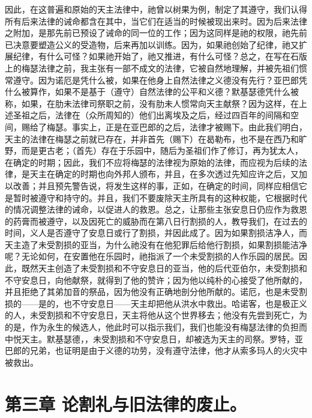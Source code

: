 因此，在这普遍和原始的天主法律中，祂曾以树果为例，制定了其遵守，我们认得所有后来法律的诫命都含在其中，当它们在适当的时候被现出来时。因为后来法律之附加，是那先前已预设了诫命的同一位的工作；因为这同样是祂的权限，祂先前已决意要塑造公义的受造物，后来再加以训练。因为，如果祂创始了纪律，祂又扩展纪律，有什么可怪？如果祂开始了，祂又推进，有什么可怪？总之，在写在石版上的梅瑟法律之前，我主张有一部不成文的法律，它被自然地理解，并被先祖们惯常遵守。因为诺厄是凭什么被，如果在他身上自然法律之义德没有先行？亚巴郎凭什么被算作，如果不是基于（遵守）自然法律的公平和义德？默基瑟德凭什么被称，如果，在肋未法律司祭职之前，没有肋未人惯常向天主献祭？因为这样，在上述圣祖之后，法律在（众所周知的）他们出离埃及之后，经过四百年的间隔和空间，赐给了梅瑟。事实上，正是在亚巴郎的之后，法律才被赐下。由此我们明白，天主的法律在梅瑟之前就已存在，并非首先（赐下）在曷勒布，也不是在西乃和旷野，而是更古老；（首先）存在于乐园中，随后为圣祖们作了修订，再为犹太人，在确定的时期；因此，我们不应将梅瑟的法律视为原始的法律，而应视为后续的法律，是天主在确定的时期也向外邦人颁布，并且，在多次透过先知应许之后，又加以改善；并且预先警告说，将发生这样的事，正如，在确定的时间，同样应相信它是暂时被遵守和持守的。并且，我们不要废除天主所具有的这种权能，它根据时代的情况调整法律的诫命，以促进人的救恩。总之，让那些主张安息日仍应作为救恩的药膏而被遵守，以及因死亡的威胁而在第八日行割损的人，教导我们，在过去的时间，义人是否遵守了安息日或行了割损，并因此成了。因为如果割损洁净人，而天主造了未受割损的亚当，为什么祂没有在他犯罪后给他行割损，如果割损能洁净呢？无论如何，在安置他在乐园时，祂指派了一个未受割损的人作乐园的居民。因此，既然天主创造了未受割损和不守安息日的亚当，他的后代亚伯尔，未受割损和不守安息日，向他献祭，就得到了他的赞许；因为他以纯朴的心接受了他所献的，并且拒绝了其弟加音的祭品，因为他没有正确地剖分他所献的。诺厄，也是未受割损的——是的，也不守安息日——天主却把他从洪水中救出。哈诺客，也是极正义的人，未受割损和不守安息日，天主将他从这个世界移去；他没有先尝到死亡，为的是，作为永生的候选人，他此时可以指示我们，我们也能没有梅瑟法律的负担而中悦天主。默基瑟德，，未受割损和不守安息日，却被选为天主的司祭。罗特，亚巴郎的兄弟，也证明是由于义德的功劳，没有遵守法律，他才从索多玛人的火灾中被救出。\par


\section{第三章 论割礼与旧法律的废止。}

